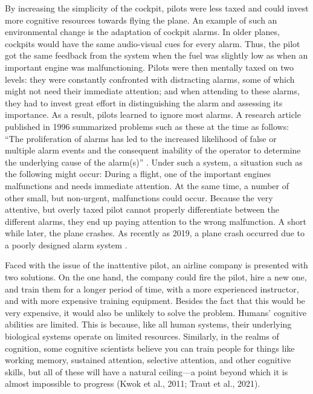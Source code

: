 \documentclass[empirical, author-date]{jote-article}
\begin{document}
By increasing the simplicity of the cockpit, pilots were less taxed and could invest more cognitive resources towards flying the plane. An example of such an environmental change is the adaptation of cockpit alarms. In older planes, cockpits would have the same audio-visual cues for every alarm. Thus, the pilot got the same feedback from the system when the fuel was slightly low as when an important engine was malfunctioning. Pilots were then mentally taxed on two levels: they were constantly confronted with distracting alarms, some of which might not need their immediate attention; and when attending to these alarms, they had to invest great effort in distinguishing the alarm and assessing its importance. As a result, pilots learned to ignore most alarms. A research article published in 1996 summarized problems such as these at the time as follows: “The proliferation of alarms has led to the increased likelihood of false or multiple alarm events and the consequent inability of the operator to determine the underlying cause of the alarm(s)” \parencite[pp. 12][undefined]{Gilson1996}. Under such a system, a situation such as the following might occur: During a flight, one of the important engines malfunctions and needs immediate attention. At the same time, a number of other small, but non-urgent, malfunctions could occur. Because the very attentive, but overly taxed pilot cannot properly differentiate between the different alarms, they end up paying attention to the wrong malfunction. A short while later, the plane crashes. As recently as 2019, a plane crash occurred due to a poorly designed alarm system \parencite{Levin2019}. 

Faced with the issue of the inattentive pilot, an airline company is presented with two solutions. On the one hand, the company could fire the pilot, hire a new one, and train them for a longer period of time, with a more experienced instructor, and with more expensive training equipment. Besides the fact that this would be very expensive, it would also be unlikely to solve the problem. Humans' cognitive abilities are limited. This is because, like all human systems, their underlying biological systems operate on limited resources. Similarly, in the realms of cognition, some cognitive scientists believe you can train people for things like working memory, sustained attention, selective attention, and other cognitive skills, but all of these will have a natural ceiling—a point beyond which it is almost impossible to progress (Kwok et al., 2011; Traut et al., 2021). 
\end{document}
